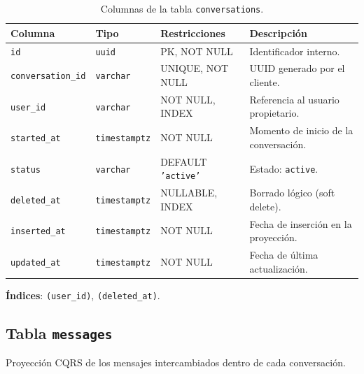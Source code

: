 \begin{table}[h]
\centering
\caption{Columnas de la tabla \texttt{conversations}.}
\label{tab:conversations}
\begin{tabular}{llp{3.5cm}p{4.5cm}}
\hline
\textbf{Columna} & \textbf{Tipo} & \textbf{Restricciones} & \textbf{Descripción} \\
\hline
\texttt{id}               & \texttt{uuid}        & PK, NOT NULL        & Identificador interno. \\
\texttt{conversation\_id} & \texttt{varchar}     & UNIQUE, NOT NULL    & UUID generado por el cliente. \\
\texttt{user\_id}         & \texttt{varchar}     & NOT NULL, INDEX     & Referencia al usuario propietario. \\
\texttt{started\_at}      & \texttt{timestamptz} & NOT NULL            & Momento de inicio de la conversación. \\
\texttt{status}           & \texttt{varchar}     & DEFAULT \texttt{'active'} & Estado: \texttt{active}. \\
\texttt{deleted\_at}      & \texttt{timestamptz} & NULLABLE, INDEX     & Borrado lógico (soft delete). \\
\texttt{inserted\_at}     & \texttt{timestamptz} & NOT NULL            & Fecha de inserción en la proyección. \\
\texttt{updated\_at}      & \texttt{timestamptz} & NOT NULL            & Fecha de última actualización. \\
\hline
\end{tabular}
\end{table}

\textbf{Índices}: \texttt{(user\_id)}, \texttt{(deleted\_at)}.

\subsection{Tabla \texttt{messages}}

Proyección CQRS de los mensajes intercambiados dentro de cada conversación.

